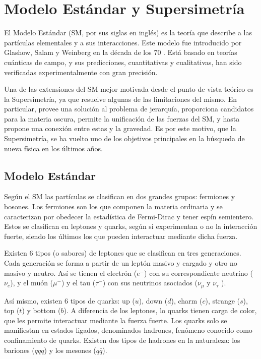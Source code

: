 \chapter{Modelo Estándar y Supersimetría}


El Modelo Estándar (SM, por sus siglas en inglés) es la teoría que describe a las partículas elementales y a sus interacciones. Este modelo fue introducido por Glashow, Salam y Weinberg en la década de los 70 \cite{Glashow:1961tr,Salam:1968rm,Weinberg:1967tq}. Está basado en teorías cuánticas de campo, y sus predicciones, cuantitativas y cualitativas, han sido verificadas experimentalmente con gran precisión.

Una de las extensiones del SM mejor motivada desde el punto de vista teórico es la Supersimetría, ya que resuelve algunas de las limitaciones del mismo. En particular, provee una solución al problema de jerarquía, proporciona candidatos para la materia oscura, permite la unificación de las fuerzas del SM, y hasta propone una conexión entre estas y la gravedad. Es por este motivo, que la Supersimetría, se ha vuelto uno de los objetivos principales en la búsqueda de nueva física en los últimos años.

\section{Modelo Estándar}
 
Según el SM las partículas se clasifican en dos grandes grupos: fermiones y bosones. Los fermiones son los que componen la materia ordinaria y se caracterizan por obedecer la estadística de Fermi-Dirac y tener espín semientero. Estos se clasifican en leptones y quarks, según si experimentan o no la interacción fuerte, siendo los últimos los que pueden interactuar mediante dicha fuerza.  

Existen 6 tipos (o sabores) de leptones que se clasifican en tres generaciones. Cada generación se forma a partir de un leptón masivo y cargado y otro no masivo y neutro. Así se tienen el electrón ($e^{-}$) con su correspondiente neutrino ($\nu_{e}$), y el muón ($\mu^{-}$) y el tau ($\tau^{-}$) con sus neutrinos asociados ($\nu_{\mu}$ y $\nu_{\tau}$ ).


Así mismo, existen 6 tipos de quarks: up ($u$), down ($d$), charm ($c$), strange ($s$), top ($t$) y bottom ($b$). A diferencia de los leptones, lo quarks tienen carga de color, que les permite interactuar mediante la fuerza fuerte. Los quarks solo se manifiestan en estados ligados, denominados hadrones, fenómeno conocido
como confinamiento de quarks. Existen dos tipos de hadrones en la naturaleza: los bariones ($qqq$) y los mesones ($q\bar{q}$).

